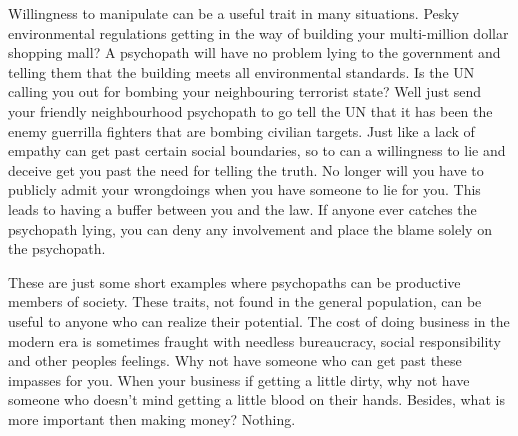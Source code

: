 \documentclass[12pt,jou]{apa}
\begin{document}
Willingness to manipulate can be a useful trait in many situations. Pesky
environmental regulations getting in the way of building your multi-million dollar
shopping mall? A psychopath will have no problem lying to the government and
telling them that the building meets all environmental standards. Is the UN
calling you out for bombing your neighbouring terrorist state? Well just send
your friendly neighbourhood psychopath to go tell the UN that it has been the
enemy guerrilla fighters that are bombing civilian targets. Just like a lack of
empathy can get past certain social boundaries, so to can a willingness to lie
and deceive get you past the need for telling the truth. No longer will you have
to publicly admit your wrongdoings when you have someone to lie for you. This
leads to having a buffer between you and the law. If anyone ever catches the
psychopath lying, you can deny any involvement and place the blame solely on the
psychopath. 

These are just some short examples where psychopaths can be productive members
of society. These traits, not found in the general population, can be useful to
anyone who can realize their potential. The cost of doing business in the modern
era is sometimes fraught with needless bureaucracy, social responsibility and
other peoples feelings. Why not have someone who can get past these impasses for
you. When your business if getting a little dirty, why not have someone who
doesn't mind getting a little blood on their hands. Besides, what is more
important then making money? Nothing. 
\newpage

\end{document}
